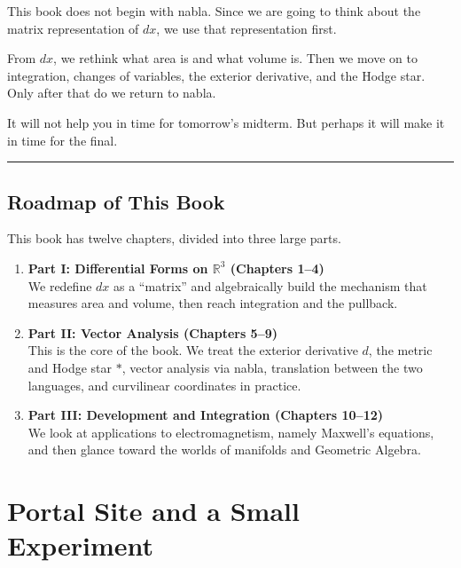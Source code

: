 This book does not begin with nabla. Since we are going to think about
the matrix representation of \(dx\), we use that representation first.

From \(dx\), we rethink what area is and what volume is. Then we move on
to integration, changes of variables, the exterior derivative, and the
Hodge star. Only after that do we return to nabla.

It will not help you in time for tomorrow's midterm. But perhaps it will
make it in time for the final.

\begin{center}\rule{0.5\linewidth}{0.5pt}\end{center}

\hypertarget{roadmap-of-this-book}{%
\section{Roadmap of This Book}\label{roadmap-of-this-book}}

This book has twelve chapters, divided into three large parts.

\begin{enumerate}
\def\labelenumi{\arabic{enumi}.}
\tightlist
\item
  \textbf{Part I: Differential Forms on $\mathbb{R}^3$ (Chapters 1–4)}\\
  We redefine \(dx\) as a ``matrix'' and algebraically build the
  mechanism that measures area and volume, then reach integration and
  the pullback.
\item
  \textbf{Part II: Vector Analysis (Chapters 5–9)}\\
  This is the core of the book. We treat the exterior derivative \(d\),
  the metric and Hodge star \(\ast\), vector analysis via nabla,
  translation between the two languages, and curvilinear coordinates in
  practice.
\item
  \textbf{Part III: Development and Integration (Chapters 10–12)}\\
  We look at applications to electromagnetism, namely Maxwell's
  equations, and then glance toward the worlds of manifolds and
  Geometric Algebra.
\end{enumerate}

\newpage

\hypertarget{portal-site-and-a-small-experiment}{%
\chapter{Portal Site and a Small
Experiment}\label{portal-site-and-a-small-experiment}}

